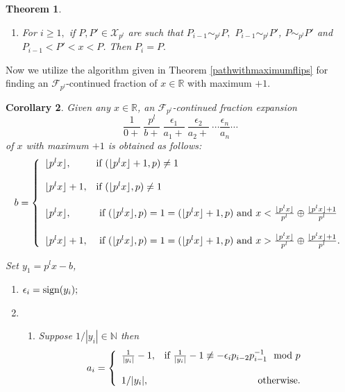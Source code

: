 \documentclass[12pt]{elsarticle}
\newtheorem{theorem}{Theorem}[section]
\newtheorem{corollary}[theorem]{Corollary}
\theoremstyle{definition}
\newcommand{\field}[1]{\mathbb{#1}}          \newcommand{\Q}{\field{Q}}
\newcommand{\N}{\field{N}}
\newcommand{\R}{\field{R}}                   \newcommand{\Z}{\field{Z}}
\newcommand{\mX}{{\mathcal X}}
\newcommand{\f}{{\mathcal F}}
\newcommand{\ep}{\epsilon}
\newcommand{\sign}{\textnormal{sign}}
\begin{document}
{\begin{theorem}
\begin{enumerate}
 		\item For $i\ge1,$ 
 		if $P, P'\in\mX_{p^l}$ are such that  $P_{i-1}\sim_{p^l} P,$ $P_{i-1}\sim_{p^l} P'$,  $P\sim_{p^l} P'$ and $P_{i-1}<P'<x<P$. Then $P_i=P.$ 
 	\end{enumerate}
 \end{theorem}
 
 Now we utilize the algorithm given in Theorem \ref{pathwithmaximumflips} for finding an $\f_{p^l}$-continued fraction of $x\in\R$ with maximum $+1$.
 \begin{corollary} \label{algoformaximumflips} Given any $x\in\R$, an $\f_{p^l}$-continued fraction expansion $$\frac{1}{0+}~\frac{p^l}{b+}~\frac{\epsilon_{1} }{a_{1}+}~\frac{\epsilon_{2}}{a_{2}+}~\cdots\frac{\epsilon_{n}}{a_{n}}\cdots$$ of $x$ with maximum $+1$ is obtained as follows:
 	$$b=\left\{
 	\begin{array}{ll}
 	\lfloor p^l x\rfloor, &\mbox{if } 							
 	
 	(\lfloor p^l x\rfloor+1,p)\neq1\\\\
 	\lfloor p^l x\rfloor+1, &\mbox{if } 							
 	(\lfloor p^l x\rfloor,p)\neq1\\\\
 	
 	\lfloor p^l x\rfloor,& \mbox{ if } (\lfloor p^l x\rfloor,p)=1=(\lfloor p^l x\rfloor+1,p)  \textnormal{ and }  x<	\frac{\lfloor p^l x\rfloor}{p^l}\oplus\frac{\lfloor p^l x\rfloor+1}{p^l}\\\\
 	
 	
 	
 	
 	\lfloor p^l x\rfloor+1, &  \mbox{ if } (\lfloor p^l x\rfloor,p)=1=(\lfloor p^l x\rfloor+1,p) \textnormal{ and } 	x>	\frac{\lfloor p^l x\rfloor}{p^l}\oplus\frac{\lfloor p^l x\rfloor+1}{p^l}.
 	\end{array}
 	\right.$$	
 	
  Set $y_1=p^lx-b$, 
 	\begin{enumerate}
 		\item   $\ep_{i}=\sign (y_i);$\\
 		\item \begin{enumerate}
 			\item Suppose $1/|y_i|\in\N$ then 
 			$$a_i=\left\{ \begin{array}{lr}
 			\frac{1}{|y_i|}-1, & 	\textnormal{if } \frac{1}{|y_i|}-1\not\equiv -\ep_i p_{i-2}p_{i-1}^{-1}\mod p\\\\
 			1/|y_i|, & \textnormal{otherwise}.
 			\end{array}\right.$$
 			

\end{enumerate}
\end{enumerate}
\end{corollary}}
\end{document}
